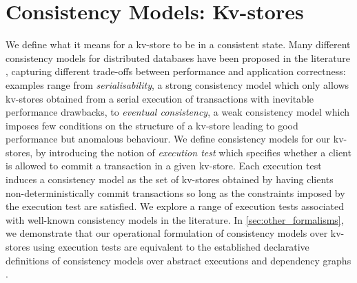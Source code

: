 \section{Consistency Models: Kv-stores}
\label{sec:cm}
We define what it means for a kv-store 
to be in a consistent state. Many different consistency models for
distributed databases have 
been proposed in the literature
\cite{principle-eventual-consistency,rola,redblue,PSI,si},
capturing different trade-offs 
between  performance and application
correctness: examples range from  \emph{serialisability}, a strong
consistency model which only allows kv-stores 
obtained  from a serial execution of transactions
with inevitable performance drawbacks, to  \emph{eventual consistency},  a weak consistency model
which imposes few conditions on the structure of a kv-store leading to
good performance but anomalous behaviour.
We define consistency models for our kv-stores,
by introducing the notion of 
\emph{execution test} which specifies  whether a client is allowed to commit a transaction in a given 
kv-store. Each execution test induces a consistency model as the set of kv-stores obtained 
by having clients non-deterministically commit transactions so long as  the constraints 
imposed by the execution test are satisfied.
We explore a range of execution tests  associated with well-known consistency models in the literature. 
In \cref{sec:other_formalisms},  we demonstrate that our operational
formulation of  consistency models over kv-stores using execution
tests are  equivalent to the established declarative definitions of
consistency models  over abstract executions \cite{ev_transactions,framework-concur} and dependency graphs \cite{adya}.


%
%
%





%
%

